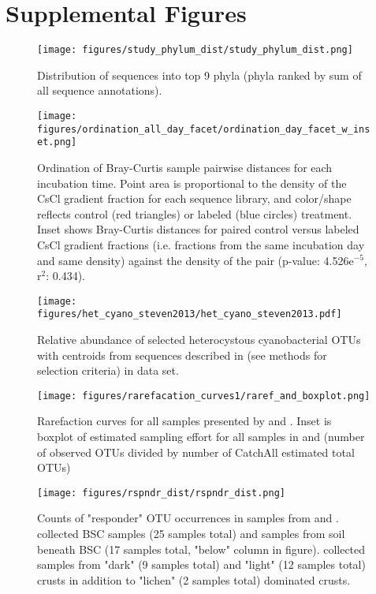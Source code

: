 \section{Supplemental Figures}
\newpage

\begin{figure}[h!]
  \centering
  \caption{Distribution of sequences into top 9 phyla (phyla ranked by sum of all sequence annotations).}
    \texttt{[image: figures/study\_phylum\_dist/study\_phylum\_dist.png]}
  \label{fig:study_phy_dist}
\end{figure}

\begin{figure}[H]
  \centering
  \caption{Ordination of Bray-Curtis sample pairwise distances for each incubation time. Point area is proportional to the density of the CsCl gradient fraction for each sequence library, and color/shape reflects control (red triangles) or labeled (blue circles) treatment. Inset shows Bray-Curtis distances for paired control versus labeled CsCl gradient fractions (i.e. fractions from the same incubation day and same density) against the density of the pair (p-value: 4.526e$^{-5}$, r$^{2}$: 0.434).}
  \texttt{[image: figures/ordination\_all\_day\_facet/ordination\_day\_facet\_w\_inset.png]}
  \label{fig:ordination}
\end{figure}

\begin{figure}[H]
  \centering
  \caption{Relative abundance of selected heterocystous cyanobacterial OTUs with centroids from sequences described in \citet{Yeager} (see methods for selection criteria) in \citet{Steven_2013} data set.}
    \texttt{[image: figures/het\_cyano\_steven2013/het\_cyano\_steven2013.pdf]}
  \label{fig:het_steven}
\end{figure}

\begin{figure}[H]
  \centering
  \caption{Rarefaction curves for all samples presented by \citet{Garcia_Pichel_2013} and \citet{Steven_2013}. Inset is boxplot of estimated sampling effort for all samples in \citet{Garcia_Pichel_2013} and \citet{Steven_2013} (number of observed OTUs divided by number of CatchAll \cite{BUNGE_2010} estimated total OTUs)}
    \texttt{[image: figures/rarefacation\_curves1/raref\_and\_boxplot.png]}
  \label{fig:rarefaction}
\end{figure}

\begin{figure}[H]
  \centering
  \caption{Counts of "responder" OTU occurrences in samples from \citet{Steven_2013} and \citet{Garcia_Pichel_2013}. \citet{Steven_2013} collected BSC samples (25 samples total) and samples from soil beneath BSC (17 samples total, "below" column in figure). \citet{Garcia_Pichel_2013} collected samples from "dark" (9 samples total) and "light" (12 samples total) crusts in addition to "lichen" (2 samples total) dominated crusts.}
    \texttt{[image: figures/rspndr\_dist/rspndr\_dist.png]}
  \label{fig:rspndr_dist}
\end{figure}
